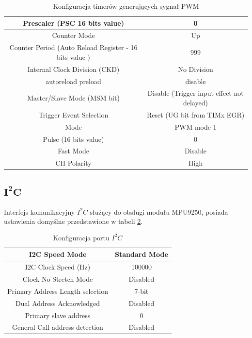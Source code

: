 \begin{table}[h!]
    \centering
    \caption{Konfiguracja timerów generujących sygnał PWM}
    \begin{tabular}{|c|c|}
        \hline
        Prescaler (PSC 16 bits value) & 0 \\
        \hline
        Counter Mode & Up \\
        \hline
        Counter Period (Auto Reload Register - 16 bits value ) & 999 \\
        \hline
        Internal Clock Division (CKD) & No Division \\
        \hline
        auto\-reload preload & disable \\
        \hline
        Master/Slave Mode (MSM bit) & Disable (Trigger input effect not delayed) \\
        \hline
        Trigger Event Selection & Reset (UG bit from TIMx EGR) \\
        \hline
        Mode & PWM mode 1 \\
        \hline
        Pulse (16 bits value) & 0 \\
        \hline
        Fast Mode & Disable \\
        \hline
        CH Polarity & High \\
        \hline
    \end{tabular}
    \label{Konfiguracja PWM}
\end{table}

\subsection{$\mathbf{I^{2}C}$}

Interfejs komunikacyjny $I^2C$ służący do obsługi modułu MPU9250, posiada ustawienia domyślne przedstawione w tabeli \ref{Konfiguracja portu I2C}.

\begin{table}[h!]
    \centering
    \caption{Konfiguracja portu $I^2C$}
    \begin{tabular}{|c|c|}
        \hline
        I2C Speed Mode & Standard Mode \\
        \hline
        I2C Clock Speed (Hz) & 100000 \\
        \hline
        Clock No Stretch Mode & Disabled \\
        \hline
        Primary Address Length selection & 7-bit \\
        \hline
        Dual Address Acknowledged & Disabled \\
        \hline
        Primary slave address & 0 \\
        \hline
        General Call address detection & Disabled \\
        \hline
    \end{tabular}
    \label{Konfiguracja portu I2C}
\end{table}


